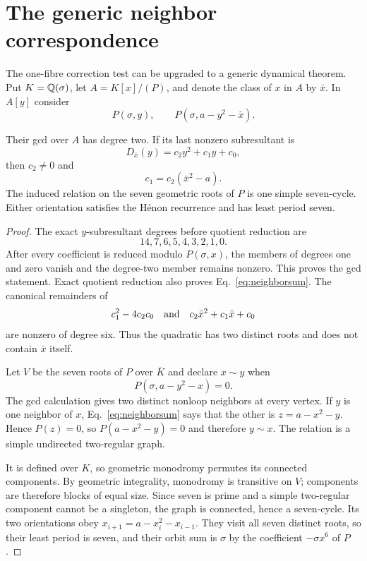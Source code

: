 \section{The generic neighbor correspondence}\label{sec:neighbor}

The one-fibre correction test can be upgraded to a generic dynamical theorem.
Put $K=\mathbb Q(\sigma)$, let $A=K[x]/(P)$, and denote the class of $x$ in $A$ by
$\bar x$.  In $A[y]$ consider
\[
 P(\sigma,y),\qquad P(\sigma,a-y^2-\bar x).
\]

\begin{theorem}\label{thm:neighbor}
Their gcd over $A$ has degree two.  If its last nonzero subresultant is
\[
 D_{\bar x}(y)=c_2y^2+c_1y+c_0,
\]
then $c_2\ne0$ and
\begin{equation}\label{eq:neighborsum}
 c_1=c_2(\bar x^2-a).
\end{equation}
The induced relation on the seven geometric roots of $P$ is one simple
seven-cycle.  Either orientation satisfies the H\'enon recurrence and has
least period seven.
\end{theorem}

\begin{proof}
The exact $y$-subresultant degrees before quotient reduction are
\[
14,7,6,5,4,3,2,1,0.
\]
After every coefficient is reduced modulo $P(\sigma,x)$, the members of
degrees one and zero vanish and the degree-two member remains nonzero.  This
proves the gcd statement.  Exact quotient reduction also proves
Eq.~\eqref{eq:neighborsum}.  The canonical remainders of
\[
 c_1^2-4c_2c_0
 \quad\hbox{and}\quad
 c_2\bar x^2+c_1\bar x+c_0
\]
are nonzero of degree six.  Thus the quadratic has two distinct roots and
does not contain $\bar x$ itself.

Let $V$ be the seven roots of $P$ over $\overline K$ and declare $x\sim y$
when
\[
 P(\sigma,a-y^2-x)=0.
\]
The gcd calculation gives two distinct nonloop neighbors at every vertex.  If
$y$ is one neighbor of $x$, Eq.~\eqref{eq:neighborsum} says that the other is
$z=a-x^2-y$.  Hence $P(z)=0$, so $P(a-x^2-y)=0$ and therefore $y\sim x$.
The relation is a simple undirected two-regular graph.

It is defined over $K$, so geometric monodromy permutes its connected
components.  By geometric integrality, monodromy is transitive on $V$;
components are therefore blocks of equal size.  Since seven is prime and a
simple two-regular component cannot be a singleton, the graph is connected,
hence a seven-cycle.  Its two orientations obey
$x_{i+1}=a-x_i^2-x_{i-1}$.  They visit all seven distinct roots, so their
least period is seven, and their orbit sum is $\sigma$ by the coefficient
$-\sigma x^6$ of $P$.
\end{proof}

